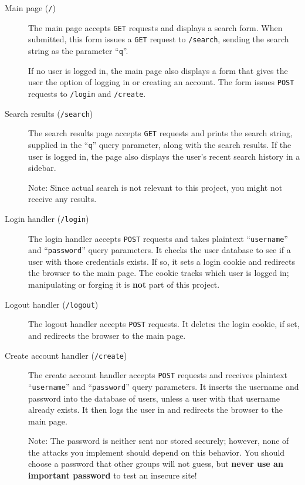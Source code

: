\documentclass[letterpaper,12pt]{report}
\begin{document}
\begin{description}
	
\item[Main page (\texttt{/})]
	
	The main page accepts \texttt{GET} requests and displays a search form. When submitted, this form issues a \texttt{GET} request to \texttt{/search}, sending the search string as the parameter ``\texttt{q}''.  
	
	If no user is logged in, the main page also displays a form that gives the user the option of logging in or creating an account.  The form issues \texttt{POST} requests to \texttt{/login} and \texttt{/create}.
	
	\item[Search results (\texttt{/search})]
	
	The search results page accepts \texttt{GET} requests and prints the search string, supplied in the ``\texttt{q}'' query parameter, along with the search results.   If the user is logged in, the page also displays the user's recent search history in a sidebar.
	
	{Note: Since actual search is not relevant to this project, you might not receive any results.}
	
	\item[Login handler (\texttt{/login})]
	
	The login handler accepts \texttt{POST} requests and takes plaintext ``\texttt{username}'' and ``\texttt{password}'' query parameters.  It checks the user database to see if a user with those credentials exists.  If so, it sets a login cookie and redirects the browser to the main page.  The cookie tracks which user is logged in; manipulating or forging it is \textbf{not} part of this project.
	
	\item[Logout handler (\texttt{/logout})]
	
	The logout handler accepts \texttt{POST} requests.  It deletes the login cookie, if set, and redirects the browser to the main page.
	\smallskip
	
	\item[Create account handler (\texttt{/create})]
	
	The create account handler accepts \texttt{POST} requests and receives plaintext ``\texttt{username}'' and ``\texttt{password}'' query parameters.  It inserts the username and password into the database of users, unless a user with that username already exists.  It then logs the user in and redirects the browser to the main page.
	
	{Note: The password is neither sent nor stored securely; however, none of the attacks you implement should depend on this behavior.  You should choose a password that other groups will not guess, but {\bf never use an important password} to test an insecure site!}
	
\end{description}
\end{document}
